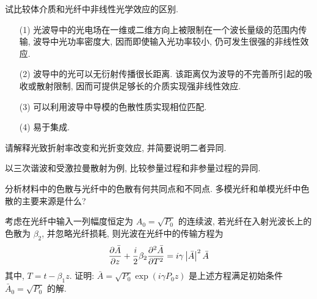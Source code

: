 \documentclass{assignment}
\begin{document}
\begin{prob}
    试比较体介质和光纤中非线性光学效应的区别.
\end{prob}
\begin{sol}
    \begin{itemize}
        \item[(1)] 光波导中的光电场在一维或二维方向上被限制在一个波长量级的范围内传输, 波导中光功率密度大, 因而即使输入光功率较小, 仍可发生很强的非线性效应.
        \item[(2)] 波导中的光可以无衍射传播很长距离. 该距离仅为波导的不完善所引起的吸收或散射限制, 因而可提供足够长的介质实现强非线性效应.
        \item[(3)] 可以利用波导中导模的色散性质实现相位匹配.
        \item[(4)] 易于集成.
    \end{itemize}
\end{sol}

\begin{prob}
    请解释光致折射率改变和光折变效应, 并简要说明二者异同.
\end{prob}
\begin{sol}
    
\end{sol}

\begin{prob}
    以三次谐波和受激拉曼散射为例, 比较参量过程和非参量过程的异同.
\end{prob}
\begin{sol}
    
\end{sol}

\begin{prob}
    分析材料中的色散与光纤中的色散有何共同点和不同点. 多模光纤和单模光纤中色散的主要来源是什么?
\end{prob}
\begin{sol}
    
\end{sol}

\begin{prob}
    考虑在光纤中输入一列幅度恒定为 $A_0=\sqrt{P_0}$ 的连续波, 若光纤在入射光波长上的色散为 $\beta_2$, 并忽略光纤损耗, 则光波在光纤中的传输方程为
    \[
        \frac{\partial\bar{A}}{\partial z}+\frac{i}{2}\beta_2\frac{\partial^2\bar{A}}{\partial T^2}=i\gamma\left\lvert\bar{A}\right\rvert^2\bar{A}
    \]
    其中, $T=t-\beta_1z$. 证明: $\bar{A}=\sqrt{P_0}\exp(i\gamma P_0z)$ 是上述方程满足初始条件 $\bar{A}_0=\sqrt{P_0}$ 的解.
\end{prob}
\begin{pf}
    
\end{pf}
\end{document}
